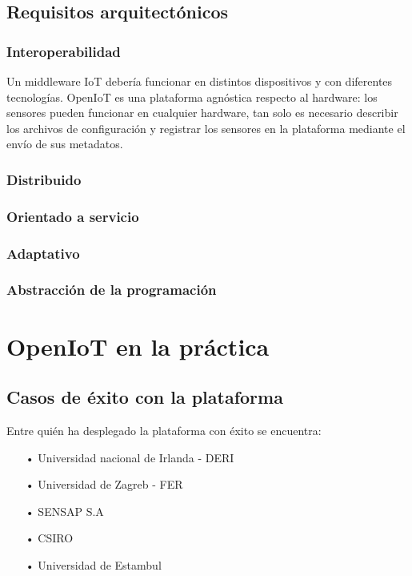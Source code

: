 \documentclass[12pt, twoside]{book}
\begin{document}
\subsection{Requisitos arquitectónicos}
\subsubsection*{Interoperabilidad}
Un middleware IoT debería funcionar en distintos dispositivos y con diferentes tecnologías. OpenIoT es una plataforma agnóstica respecto al hardware: los sensores pueden funcionar en cualquier hardware, tan solo es necesario describir los archivos de configuración y registrar los sensores en la plataforma mediante el envío de sus metadatos.  

\subsubsection*{Distribuido}






\subsubsection*{Orientado a servicio}


\subsubsection*{Adaptativo}

\subsubsection*{Abstracción de la programación}

\section{OpenIoT en la práctica}

\subsection{Casos de éxito con la plataforma}
Entre quién ha desplegado la plataforma con éxito se encuentra:
\begin{itemize}
\item[•] Universidad nacional de Irlanda - DERI
\item[•] Universidad de Zagreb - FER
\item[•] SENSAP S.A
\item[•] CSIRO
\item[•] Universidad de Estambul
\end{itemize}
\end{document}
